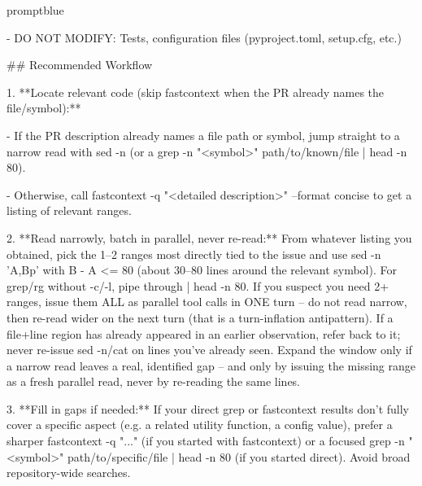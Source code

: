 \begin{promptbox}{promptblue}
{- DO NOT MODIFY: Tests, configuration files (pyproject.toml, setup.cfg, etc.)\par
\vspace{0.35em}\par
\#\# Recommended Workflow\par
\vspace{0.35em}\par
1. **Locate relevant code (skip fastcontext when the PR already names the file/symbol):**\par
\hspace*{1.35em}- If the PR description already names a file path or symbol, jump straight to a narrow read with \textasciigrave{}sed -n\textasciigrave{} (or a \textasciigrave{}grep -n "\textless{}symbol\textgreater{}" path/to/known/file | head -n 80\textasciigrave{}).\par
\hspace*{1.35em}- Otherwise, call \textasciigrave{}fastcontext -q "\textless{}detailed description\textgreater{}" --format concise\textasciigrave{} to get a listing of relevant ranges.\par
2. **Read narrowly, batch in parallel, never re-read:** From whatever listing you obtained, pick the 1--2 ranges most directly tied to the issue and use \textasciigrave{}sed -n 'A,Bp'\textasciigrave{} with \textasciigrave{}B - A \textless{}= 80\textasciigrave{} (about 30--80 lines around the relevant symbol). For \textasciigrave{}grep\textasciigrave{}/\textasciigrave{}rg\textasciigrave{} without \textasciigrave{}-c\textasciigrave{}/\textasciigrave{}-l\textasciigrave{}, pipe through \textasciigrave{}| head -n 80\textasciigrave{}. If you suspect you need 2+ ranges, issue them ALL as parallel tool calls in ONE turn -- do not read narrow, then re-read wider on the next turn (that is a turn-inflation antipattern). If a file+line region has already appeared in an earlier observation, refer back to it; never re-issue \textasciigrave{}sed -n\textasciigrave{}/\textasciigrave{}cat\textasciigrave{} on lines you've already seen. Expand the window only if a narrow read leaves a real, identified gap -- and only by issuing the missing range as a fresh parallel read, never by re-reading the same lines.\par
3. **Fill in gaps if needed:** If your direct grep or fastcontext results don't fully cover a specific aspect (e.g. a related utility function, a config value), prefer a sharper \textasciigrave{}fastcontext -q "..."\textasciigrave{} (if you started with fastcontext) or a focused \textasciigrave{}grep -n "\textless{}symbol\textgreater{}" path/to/specific/file | head -n 80\textasciigrave{} (if you started direct). Avoid broad repository-wide searches.\par
}
\end{promptbox}
